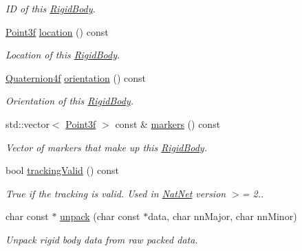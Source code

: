 \begin{DoxyCompactItemize}
\begin{DoxyCompactList}\small\item\em \-I\-D of this \hyperlink{classRigidBody}{\-Rigid\-Body}. \end{DoxyCompactList}\item 
\hypertarget{classRigidBody_a5dd602d6ad2263f72ac284394b19983c}{\hyperlink{classPoint3f}{\-Point3f} \hyperlink{classRigidBody_a5dd602d6ad2263f72ac284394b19983c}{location} () const }\label{classRigidBody_a5dd602d6ad2263f72ac284394b19983c}

\begin{DoxyCompactList}\small\item\em \-Location of this \hyperlink{classRigidBody}{\-Rigid\-Body}. \end{DoxyCompactList}\item 
\hypertarget{classRigidBody_a63dd7b3d272ebb6a231de1c7fba9d1b1}{\hyperlink{classQuaternion4f}{\-Quaternion4f} \hyperlink{classRigidBody_a63dd7b3d272ebb6a231de1c7fba9d1b1}{orientation} () const }\label{classRigidBody_a63dd7b3d272ebb6a231de1c7fba9d1b1}

\begin{DoxyCompactList}\small\item\em \-Orientation of this \hyperlink{classRigidBody}{\-Rigid\-Body}. \end{DoxyCompactList}\item 
\hypertarget{classRigidBody_ad9a2b2fd5b8bcda1209c52534e1c731e}{std\-::vector$<$ \hyperlink{classPoint3f}{\-Point3f} $>$ const \& \hyperlink{classRigidBody_ad9a2b2fd5b8bcda1209c52534e1c731e}{markers} () const }\label{classRigidBody_ad9a2b2fd5b8bcda1209c52534e1c731e}

\begin{DoxyCompactList}\small\item\em \-Vector of markers that make up this \hyperlink{classRigidBody}{\-Rigid\-Body}. \end{DoxyCompactList}\item 
\hypertarget{classRigidBody_aadc9990e94a810c9f425aca4f1e8c989}{bool \hyperlink{classRigidBody_aadc9990e94a810c9f425aca4f1e8c989}{tracking\-Valid} () const }\label{classRigidBody_aadc9990e94a810c9f425aca4f1e8c989}

\begin{DoxyCompactList}\small\item\em \-True if the tracking is valid. \-Used in \hyperlink{classNatNet}{\-Nat\-Net} version $>$= 2.. \end{DoxyCompactList}\item 
char const $\ast$ \hyperlink{classRigidBody_ac2670bcfaee0e6224a3a21c32668f415}{unpack} (char const $\ast$data, char nn\-Major, char nn\-Minor)
\begin{DoxyCompactList}\small\item\em \-Unpack rigid body data from raw packed data. \end{DoxyCompactList}\end{DoxyCompactItemize}


